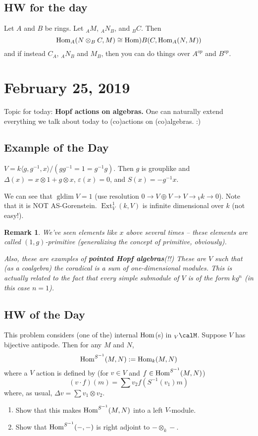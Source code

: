 \documentclass[12pt]{article}
\theoremstyle{break}
\theoremstyle{nonumberbreak}
\theoremstyle{changebreak}
\theoremstyle{break}
\theoremstyle{nonumberbreak}
\theoremstyle{nonumberplain}
\theoremstyle{change}
\newtheorem{rmk}[thm]{Remark}
\DeclareMathOperator{\Ext}{Ext}
\DeclareMathOperator{\gldim}{gldim}
\newcommand*{\Hom}{\ensuremath\text{Hom}}
\begin{document}
\subsection{HW for the day}
\begin{prob}
	Let $A$ and $B$ be rings. Let $_AM$, $_AN_B$, and $_BC$. Then 
	\[\Hom_A(N\otimes_B C,M)\cong \Hom)B(C, \Hom_A(N,M))\]
	and if instead $C_A$, $_AN_B$ and $M_B$, then you can do things over $A^{op}$ and $B^{op}$.
\end{prob}

\section{February 25, 2019}
Topic for today: \textbf{Hopf actions on algebras.} One can naturally extend everything we talk about
today to (co)actions on (co)algebras. :)
\subsection{Example of the Day}
\begin{ex}\label{ex-22519}
	$V=k\langle g,g^{-1},x\rangle/(gg^{-1}=1=g^{-1}g)$. Then $g$ is grouplike and $\Delta(x)=x\otimes1+g\otimes x$, 
	$\varepsilon(x)=0$, and $S(x)=-g^{-1}x$.

	We can see that $\gldim V=1$ (use resolution $0\to V\oplus V\to V\to {_V k}\to 0$). Note that
	it is NOT AS-Gorenstein. $\Ext_V^1(k,V)$ is infinite dimensional over $k$ (not easy!).
\end{ex}
\begin{rmk}
	We've seen elements like $x$ above several times -- these elements are called $(1,g)$-primitive 
	(generalizing the concept of primitive, obviously). 

	Also, these are examples of \textbf{pointed Hopf algebras}(!!) These are $V$ such that (as a
	coalgebra) the coradical is a sum of one-dimensional modules. This is actually related to the fact 
	that every simple submodule of $V$ is of the form $kg^n$ (in this case $n=1$).
\end{rmk}
\subsection{HW of the Day}
\begin{prob}
	This problem considers (one of the) internal $\Hom$(s) in $_V\calM$. Suppose $V$ has bijective 
	antipode. Then for any $M$ and $N$,
	\[\Hom^{S^{-1}}(M,N):=\Hom_k(M,N)\]
	where a $V$ action is defined by (for $v\in V$ and $f\in\Hom^{S^{-1}}(M,N)$) 
	\[(v\cdot f)(m)=\sum v_2f(S^{-1}(v_1)m)\]
	where, as usual, $\Delta v=\sum v_1\otimes v_2$.
	\begin{enumerate}
		\item Show that this makes $\Hom^{S^{-1}}(M,N)$ into a left $V$-module.
		\item Show that $\Hom^{S^{-1}}(-,-)$ is right adjoint to $-\otimes_k -$.
	\end{enumerate}
\end{prob}
\end{document}
